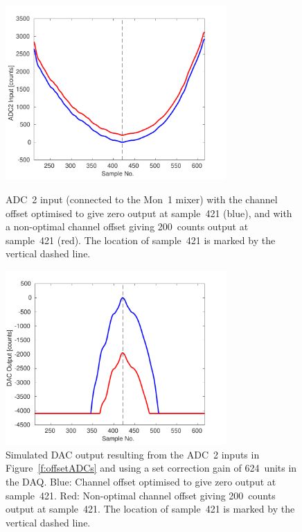 \begin{figure}
  \centering
  \includegraphics[width=0.75\textwidth]{Figures/commissioning/offsetADCs}
  \caption{ADC~2 input (connected to the Mon~1 mixer) with the channel offset optimised to give zero output at sample~421 (blue), and with a non-optimal channel offset giving 200~counts output at sample~421 (red). The location of sample~421 is marked by the vertical dashed line.}
  \label{f:offsetADCs}
  \centering
  \includegraphics[width=0.75\textwidth]{Figures/commissioning/offsetDACs}
  \caption{Simulated DAC output resulting from the ADC~2 inputs in Figure~\ref{f:offsetADCs} and using a set correction gain of 624~units in the DAQ.  Blue: Channel offset optimised to give zero output at sample~421. Red: Non-optimal channel offset giving 200~counts output at sample~421. The location of sample~421 is marked by the vertical dashed line.}
  \label{f:offsetDACs}
\end{figure}


